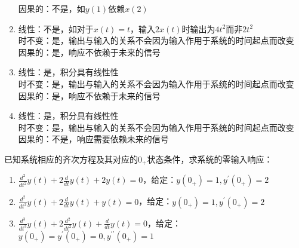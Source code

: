 \documentclass[answers]{exam}
\begin{document}
\begin{questions}
\begin{solution}
\begin{enumerate}[(1)]
	因果的：不是，如$y(1)$依赖$x(2)$\\
	\item 线性：不是，如对于$x(t)=t$，输入$2x(t)$时输出为$4t^2$而非$2t^2$\\
	时不变：是，输出与输入的关系不会因为输入作用于系统的时间起点而改变\\
	因果的：是，响应不依赖于未来的信号\\
	\item 线性：是，积分具有线性性\\
	时不变：是，输出与输入的关系不会因为输入作用于系统的时间起点而改变\\
	因果的：是，响应不依赖于未来的信号\\
	\item 线性：是，积分具有线性性\\
	时不变：是，输出与输入的关系不会因为输入作用于系统的时间起点而改变\\
	因果的：不是，响应需要依赖未来的信号\\
\end{enumerate}
\end{solution}



\question 已知系统相应的齐次方程及其对应的$0_{+}$状态条件，求系统的零输入响应：
\begin{enumerate}[(1)]
	\item $\frac{d^2}{dt^2}y(t)+2\frac{d}{dt}y(t)+2y(t)=0$，给定：$y(0_{+})=1,y^{\prime}(0_{+})=2$
	\item $\frac{d^2}{dt^2}y(t)+2\frac{d}{dt}y(t)+y(t)=0$，给定：$y(0_{+})=1,y^{\prime}(0_{+})=2$
	\item $\frac{d^3}{dt^3}y(t)+2\frac{d^2}{dt^2}y(t)+\frac{d}{dt}y(t)=0$，给定：$y(0_{+})=y^{\prime}(0_{+})=0,y^{\prime\prime}(0_{+})=1$
\end{enumerate}


\end{questions}
\end{document}
